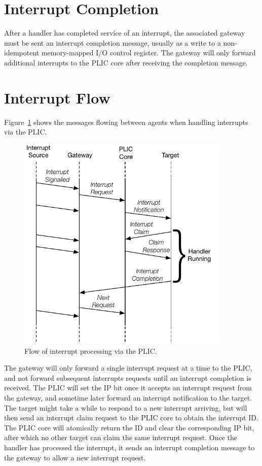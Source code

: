 \section{Interrupt Completion}

After a handler has completed service of an interrupt, the associated
gateway must be sent an interrupt completion message, usually as a
write to a non-idempotent memory-mapped I/O control register.  The
gateway will only forward additional interrupts to the PLIC core after
receiving the completion message.

\section{Interrupt Flow}

Figure~\ref{fig:intflow} shows the messages flowing between agents
when handling interrupts via the PLIC.

\begin{figure}[hb!]
\centering
\includegraphics[width=4.0in]{figs/PLIC-interrupt-flow.pdf}
\caption{ Flow of interrupt processing via the PLIC.}
\label{fig:intflow}
\end{figure}

The gateway will only forward a single interrupt request at a time to
the PLIC, and not forward subsequent interrupts requests until an
interrupt completion is received.  The PLIC will set the IP bit once
it accepts an interrupt request from the gateway, and sometime later
forward an interrupt notification to the target.  The target might
take a while to respond to a new interrupt arriving, but will then
send an interrupt claim request to the PLIC core to obtain the
interrupt ID.  The PLIC core will atomically return the ID and clear
the corresponding IP bit, after which no other target can claim the
same interrupt request.  Once the handler has processed the interrupt,
it sends an interrupt completion message to the gateway to allow a new
interrupt request.


